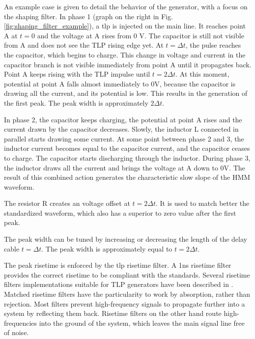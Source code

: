 An example case is given to detail the behavior of the generator, with a focus on the shaping filter.
In phase 1 (graph on the right in Fig. \ref{fig:shaping_filter_example}), a \gls{tlp} is injected on the main line.
It reaches point A at $t=0$ and the voltage at A rises from 0 V.
The capacitor is still not visible from A and does not see the TLP rising edge yet.
At $t=\Delta t$, the pulse reaches the capacitor, which begins to charge.
This change in voltage and current in the capacitor branch is not visible immediately from point A until it propagates back.
Point A keeps rising with the TLP impulse until $t=2\Delta t$.
At this moment, potential at point A falls almost immediately to 0V, because the capacitor is drawing all the current, and its potential is low.
This results in the generation of the first peak.
The peak width is approximately $2\Delta t$.

In phase 2, the capacitor keeps charging, the potential at point A rises and the current drawn by the capacitor decreases.
Slowly, the inductor L connected in parallel starts drawing some current.
At some point between phase 2 and 3, the inductor current becomes equal to the capacitor current, and the capacitor ceases to charge.
The capacitor starts discharging through the inductor.
During phase 3, the inductor draws all the current and brings the voltage at A down to 0V.
The result of this combined action generates the characteristic slow slope of the HMM waveform.

The resistor R creates an voltage offset at $t=2\Delta t$.
It is used to match better the standardized waveform, which also has a superior to zero value after the first peak.

The peak width can be tuned by increasing or decreasing the length of the delay cable $t=\Delta t$.
The peak width is approximately equal to $t=2\Delta t$.

The peak risetime is enforced by the \gls{tlp} risetime filter.
A 1ns risetime filter provides the correct risetime to be compliant with the standards.
Several risetime filters implementations suitable for TLP generators have been described in \cite{gaussian-lpf,cao-risetime-filter}.
Matched risetime filters have the particularity to work by absorption, rather than rejection.
Most filters prevent high-frequency signals to propagate further into a system by reflecting them back.
Risetime filters on the other hand route high-frequencies into the ground of the system, which leaves the main signal line free of noise.

